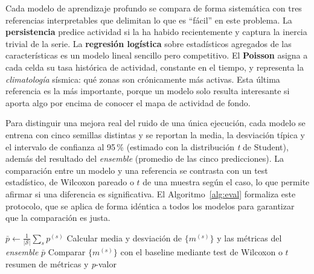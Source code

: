 Cada modelo de aprendizaje profundo se compara de forma sistemática con tres referencias
interpretables que delimitan lo que es ``fácil'' en este problema. La \textbf{persistencia}
predice actividad si la ha habido recientemente y captura la inercia trivial de la serie. La
\textbf{regresión logística} sobre estadísticos agregados de las características es un modelo
lineal sencillo pero competitivo. El \textbf{Poisson} asigna a cada celda su tasa histórica de
actividad, constante en el tiempo, y representa la \emph{climatología} sísmica: qué zonas son
crónicamente más activas. Esta última referencia es la más importante, porque un modelo solo
resulta interesante si aporta algo por encima de conocer el mapa de actividad de fondo.

Para distinguir una mejora real del ruido de una única ejecución, cada modelo se entrena con
cinco semillas distintas y se reportan la media, la desviación típica y el intervalo de
confianza al 95\,\% (estimado con la distribución \emph{t} de Student), además del resultado
del \textit{ensemble} (promedio de las cinco predicciones). La comparación entre un modelo y
una referencia se contrasta con un test estadístico, de Wilcoxon pareado o \(t\) de una
muestra según el caso, lo que permite afirmar si una diferencia es significativa. El
Algoritmo~\ref{alg:eval} formaliza este protocolo, que se aplica de forma idéntica a todos los
modelos para garantizar que la comparación es justa.

\begin{algorithm}[ht!]
  \caption{Protocolo de evaluación multi-semilla}
  \label{alg:eval}
  \DontPrintSemicolon
  $\bar{p} \leftarrow \frac{1}{|\mathcal{S}|}\sum_s p^{(s)}$ 
  Calcular media y desviación de $\{m^{(s)}\}$ y las métricas del \textit{ensemble} $\bar{p}$\;
  Comparar $\{m^{(s)}\}$ con el baseline mediante test de Wilcoxon o $t$\;
  \Return resumen de métricas y \textit{p}-valor\;
\end{algorithm}

